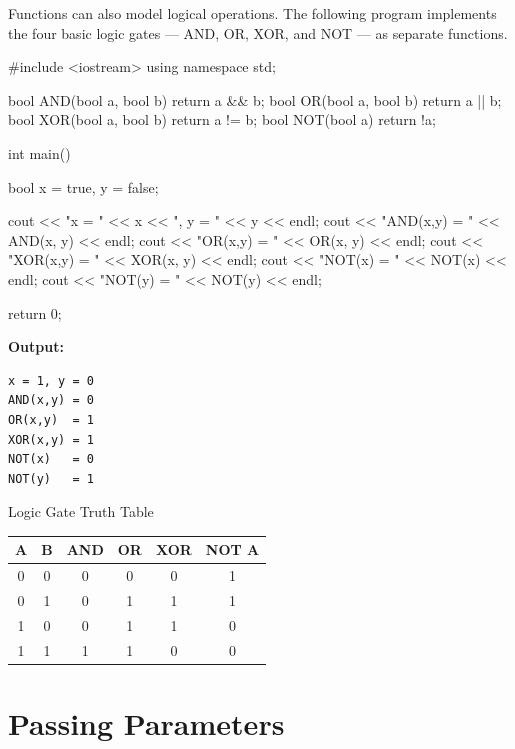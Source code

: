 Functions can also model logical operations. The following program implements
the four basic logic gates --- AND, OR, XOR, and NOT --- as separate
functions.

\begin{cppcode}
#include <iostream>
using namespace std;

bool AND(bool a, bool b) { return a && b; }
bool OR(bool a, bool b)  { return a || b; }
bool XOR(bool a, bool b) { return a != b; }
bool NOT(bool a)          { return !a;     }

int main()
{
    bool x = true, y = false;

    cout << "x = " << x << ", y = " << y << endl;
    cout << "AND(x,y) = " << AND(x, y) << endl;
    cout << "OR(x,y)  = " << OR(x, y)  << endl;
    cout << "XOR(x,y) = " << XOR(x, y) << endl;
    cout << "NOT(x)   = " << NOT(x)    << endl;
    cout << "NOT(y)   = " << NOT(y)    << endl;

    return 0;
}
\end{cppcode}

\noindent\textbf{Output:}
\begin{verbatim}
x = 1, y = 0
AND(x,y) = 0
OR(x,y)  = 1
XOR(x,y) = 1
NOT(x)   = 0
NOT(y)   = 1
\end{verbatim}

\begin{conceptbox}{Logic Gate Truth Table}
\begin{center}
\renewcommand{\arraystretch}{1.3}
\begin{tabular}{@{}cccccc@{}}
\toprule
\textbf{A} & \textbf{B} & \textbf{AND}
    & \textbf{OR} & \textbf{XOR} & \textbf{NOT A} \\
\midrule
0 & 0 & 0 & 0 & 0 & 1 \\
0 & 1 & 0 & 1 & 1 & 1 \\
1 & 0 & 0 & 1 & 1 & 0 \\
1 & 1 & 1 & 1 & 0 & 0 \\
\bottomrule
\end{tabular}
\end{center}
\end{conceptbox}

\section{Passing Parameters}
\label{sec:passing-parameters}

